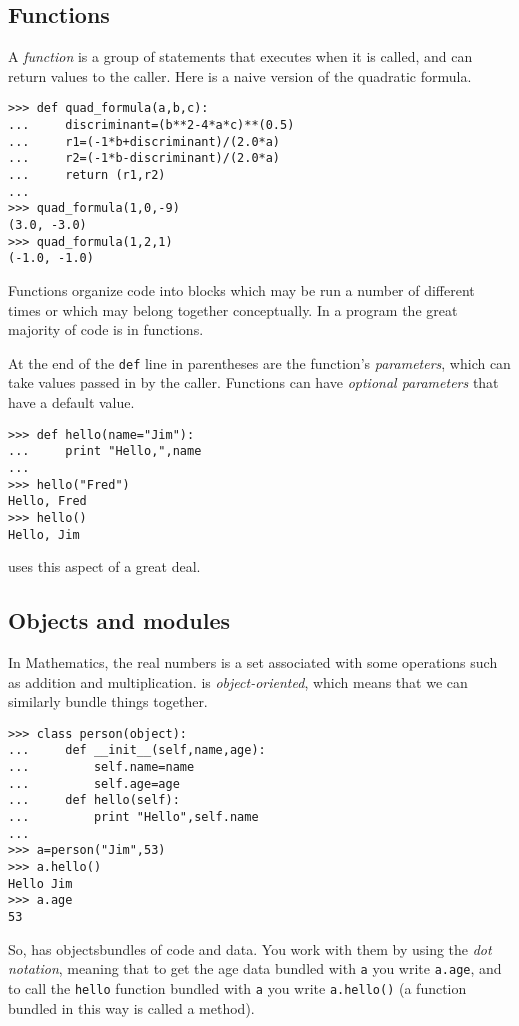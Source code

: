 \subsection{Functions}
A \textit{function} is a group of statements that executes when it is called,
and can return values to the caller.
Here is a naive version of the quadratic formula.
\begin{lstlisting}[style=python]
>>> def quad_formula(a,b,c):
...     discriminant=(b**2-4*a*c)**(0.5)
...     r1=(-1*b+discriminant)/(2.0*a)
...     r2=(-1*b-discriminant)/(2.0*a)
...     return (r1,r2)
... 
>>> quad_formula(1,0,-9)
(3.0, -3.0)
>>> quad_formula(1,2,1)
(-1.0, -1.0)
\end{lstlisting}
Functions organize code into blocks which may be 
run a number of different times or which may belong together conceptually. 
In a \python{} program the great majority of code is in functions. 

At the end of the \lstinline[style=inline]!def! line in parentheses are
the function's \textit{parameters}, which can take values 
passed in by the caller.
Functions can have \textit{optional parameters} that have a default value.
\begin{lstlisting}[style=python]
>>> def hello(name="Jim"):
...     print "Hello,",name
... 
>>> hello("Fred")
Hello, Fred
>>> hello()
Hello, Jim  
\end{lstlisting}
\Sage{} uses this aspect of \python{} a great deal.


\subsection{Objects and modules}
In Mathematics, the real numbers is a set associated with some operations
such as addition and multiplication.
\python{} is \textit{object-oriented}, which means that we can similarly bundle
things together.
\begin{lstlisting}[style=python]
>>> class person(object):
...     def __init__(self,name,age):
...         self.name=name
...         self.age=age
...     def hello(self):
...         print "Hello",self.name
... 
>>> a=person("Jim",53)
>>> a.hello()
Hello Jim
>>> a.age
53  
\end{lstlisting}
So, \python{} has 
objects\Dash bundles of code and data.
You work with them by using the \textit{dot notation}, meaning that
to get the age data bundled with \lstinline[style=inline]!a!
you write \lstinline[style=inline]!a.age!, and to 
call the \lstinline[style=inline]!hello! function bundled
with \lstinline[style=inline]!a! you write
\lstinline[style=inline]!a.hello()! 
(a function bundled in this way is called a method).

